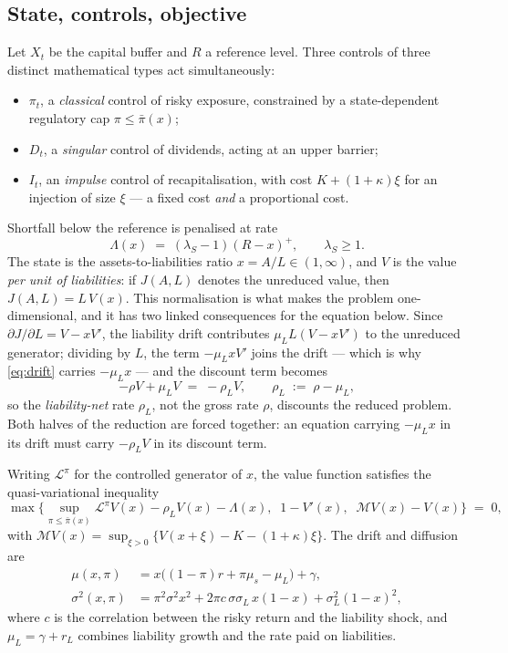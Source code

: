 \documentclass[11pt]{article}
\theoremstyle{remark}
\begin{document}
\subsection{State, controls, objective}

Let $X_t$ be the capital buffer and $R$ a reference level. Three controls
of three distinct mathematical types act simultaneously:
\begin{itemize}
\item $\pi_t$, a \emph{classical} control of risky exposure, constrained by
  a state-dependent regulatory cap $\pi \le \bar\pi(x)$;
\item $D_t$, a \emph{singular} control of dividends, acting at an upper
  barrier;
\item $I_t$, an \emph{impulse} control of recapitalisation, with cost
  $K + (1+\kappa)\xi$ for an injection of size $\xi$ --- a fixed cost
  \emph{and} a proportional cost.
\end{itemize}
Shortfall below the reference is penalised at rate
\begin{equation}
\Lambda(x) \;=\; (\lambda_S-1)(R-x)^+ , \qquad \lambda_S \ge 1 .
\label{eq:Lambda}
\end{equation}
The state is the assets-to-liabilities ratio $x = A/L \in (1,\infty)$, and
$V$ is the value \emph{per unit of liabilities}: if $J(A,L)$ denotes the
unreduced value, then $J(A,L) = L\,V(x)$. This normalisation is what makes
the problem one-dimensional, and it has two linked consequences for the
equation below. Since $\partial J/\partial L = V - xV'$, the liability
drift contributes $\mu_L L (V - xV')$ to the unreduced generator; dividing
by $L$, the term $-\mu_L x V'$ joins the drift --- which is why
\eqref{eq:drift} carries $-\mu_L x$ --- and the discount term becomes
\begin{equation}
-\rho V + \mu_L V \;=\; -\rho_L V ,
\qquad \rho_L \;:=\; \rho - \mu_L ,
\label{eq:rhoL}
\end{equation}
so the \emph{liability-net} rate $\rho_L$, not the gross rate $\rho$,
discounts the reduced problem. Both halves of the reduction are forced
together: an equation carrying $-\mu_L x$ in its drift must carry
$-\rho_L V$ in its discount term.

Writing $\mathcal{L}^\pi$ for the controlled generator of $x$, the value
function satisfies the quasi-variational inequality
\begin{equation}
\max\Big\{
\sup_{\pi \le \bar\pi(x)} \mathcal{L}^\pi V(x) - \rho_L V(x) - \Lambda(x),
\;\; 1 - V'(x),
\;\; \mathcal{M}V(x) - V(x)
\Big\} \;=\; 0,
\label{eq:qvi}
\end{equation}
with $\mathcal{M}V(x) = \sup_{\xi>0}\{V(x+\xi) - K - (1+\kappa)\xi\}$.
The drift and diffusion are
\begin{align}
\mu(x,\pi) &= x\big((1-\pi)r + \pi\mu_s - \mu_L\big) + \gamma,
\label{eq:drift}\\
\sigma^2(x,\pi) &= \pi^2\sigma^2 x^2
  + 2\pi c\,\sigma\sigma_L\, x(1-x)
  + \sigma_L^2 (1-x)^2 ,
\label{eq:diff}
\end{align}
where $c$ is the correlation between the risky return and the liability
shock, and $\mu_L = \gamma + r_L$ combines liability growth and the rate
paid on liabilities.
\end{document}
